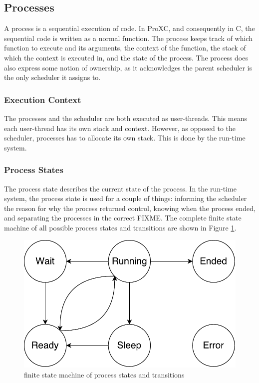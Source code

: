 \subsection{Processes}
\label{subsec:processes}

A process is a sequential execution of code. In ProXC, and consequently in C, the sequential code is written as a normal function. The process keeps track of which function to execute and its arguments, the context of the function, the stack of which the context is executed in, and the state of the process. The process does also express some notion of ownership, as it acknowledges the parent scheduler is the only scheduler it assigns to.

\subsubsection*{Execution Context}

The processes and the scheduler are both executed as user\hyp{}threads. This means each user\hyp{}thread has its own stack and context. However, as opposed to the scheduler, processes has to allocate its own stack. This is done by the run\hyp{}time system.

\subsubsection*{Process States}

The process state describes the current state of the process. In the run\hyp{}time system, the process state is used for a couple of things: informing the scheduler the reason for why the process returned control, knowing when the process ended, and separating the processes in the correct FIXME. The complete finite state machine of all possible process states and transitions are shown in Figure \ref{fig:process_state_fsm}. 
 
\FloatBarrier

\begin{figure}[h]
    \centering
    \includegraphics[width=0.6\linewidth]{fig/process_state_fsm}
    \caption{finite state machine of process states and transitions}
    \label{fig:process_state_fsm}
\end{figure}

